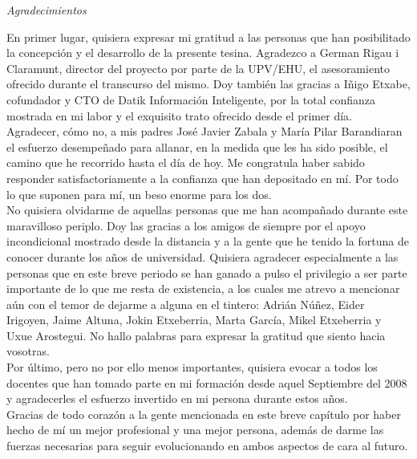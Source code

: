 \begin{flushright}
	\Large\textit{Agradecimientos}
\end{flushright}

En primer lugar, quisiera expresar mi gratitud a las personas que han posibilitado la concepción y el desarrollo de la presente tesina. Agradezco a German Rigau i Claramunt, director del proyecto por parte de la UPV/EHU, el asesoramiento ofrecido durante el transcurso del mismo. Doy también las gracias a Iñigo Etxabe, cofundador y CTO de Datik Información Inteligente, por la total confianza mostrada en mi labor y el exquisito trato ofrecido desde el primer día.\\

Agradecer, cómo no, a mis padres José Javier Zabala y María Pilar Barandiaran el esfuerzo desempeñado para allanar, en la medida que les ha sido posible, el camino que he recorrido hasta el día de hoy. Me congratula haber sabido responder satisfactoriamente a la confianza que han depositado en mí. Por todo lo que suponen para mí, un beso enorme para los dos.\\

No quisiera olvidarme de aquellas personas que me han acompañado durante este maravilloso periplo. Doy las gracias a los amigos de siempre por el apoyo incondicional mostrado desde la distancia y a la gente que he tenido la fortuna de conocer durante los años de universidad. Quisiera agradecer especialmente a las personas que en este breve periodo se han ganado a pulso el privilegio a ser parte importante de lo que me resta de existencia, a los cuales me atrevo a mencionar aún con el temor de dejarme a alguna en el tintero: Adrián Núñez, Eider Irigoyen, Jaime Altuna, Jokin Etxeberria, Marta García, Mikel Etxeberria y Uxue Arostegui. No hallo palabras para expresar la gratitud que siento hacia vosotras.\\

Por último, pero no por ello menos importantes, quisiera evocar a todos los docentes que han tomado parte en mi formación desde aquel Septiembre del 2008 y agradecerles el esfuerzo invertido en mi persona durante estos años.\\

Gracias de todo corazón a la gente mencionada en este breve capítulo por haber hecho de mí un mejor profesional y una mejor persona, además de darme las fuerzas necesarias para seguir evolucionando en ambos aspectos de cara al futuro.


